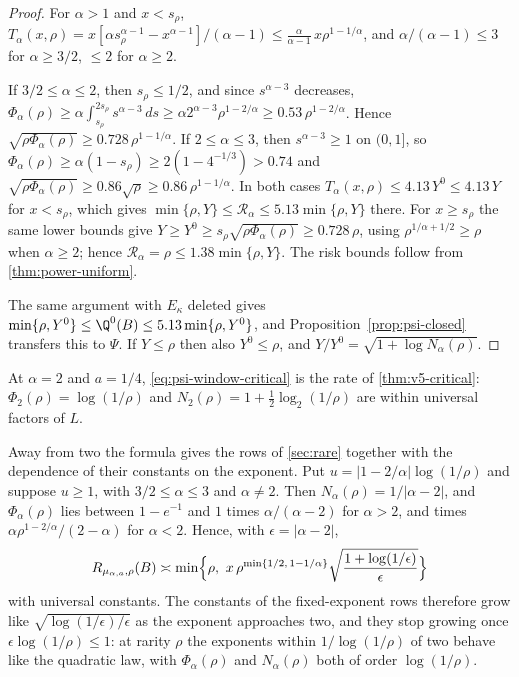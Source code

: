 \begin{proof}
For $\alpha>1$ and $x<s_\rho$,
$T_\alpha(x,\rho)=x[\alpha s_\rho^{\alpha-1}-x^{\alpha-1}]/(\alpha-1)
 \le\frac{\alpha}{\alpha-1}\,x\rho^{1-1/\alpha}$, and
$\alpha/(\alpha-1)\le3$ for $\alpha\ge3/2$, $\le2$ for $\alpha\ge2$.

If $3/2\le\alpha\le2$, then $s_\rho\le1/2$, and since $s^{\alpha-3}$
decreases,
$\Phi_\alpha(\rho)\ge\alpha\int_{s_\rho}^{2s_\rho}s^{\alpha-3}\,ds
 \ge\alpha2^{\alpha-3}\rho^{1-2/\alpha}\ge0.53\,\rho^{1-2/\alpha}$.
Hence $\sqrt{\rho\Phi_\alpha(\rho)}\ge0.728\,\rho^{1-1/\alpha}$. If
$2\le\alpha\le3$, then $s^{\alpha-3}\ge1$ on $(0,1]$, so
$\Phi_\alpha(\rho)\ge\alpha(1-s_\rho)\ge2(1-4^{-1/3})>0.74$ and
$\sqrt{\rho\Phi_\alpha(\rho)}\ge0.86\sqrt\rho\ge0.86\,\rho^{1-1/\alpha}$.
In both cases $T_\alpha(x,\rho)\le4.13\,Y^0\le4.13\,Y$ for $x<s_\rho$,
which gives $\min\{\rho,Y\}\le\mathcal R_\alpha\le5.13\min\{\rho,Y\}$ there.
For $x\ge s_\rho$ the same lower bounds give
$Y\ge Y^0\ge s_\rho\sqrt{\rho\Phi_\alpha(\rho)}\ge0.728\,\rho$, using
$\rho^{1/\alpha+1/2}\ge\rho$ when $\alpha\ge2$; hence
$\mathcal R_\alpha=\rho\le1.38\min\{\rho,Y\}$. The risk bounds follow
from \cref{thm:power-uniform}.

The same argument with $E_\kappa$ deleted gives
$\min\{\rho,Y^0\}\le\Q^0(B)\le5.13\min\{\rho,Y^0\}$, and
Proposition~\ref{prop:psi-closed} transfers this to $\Psi$. If $Y\le\rho$
then also $Y^0\le\rho$, and $Y/Y^0=\sqrt{1+\log N_\alpha(\rho)}$.
\end{proof}

\begin{remark}\label{rem:window}
At $\alpha=2$ and $a=1/4$, \eqref{eq:psi-window-critical} is the rate of
\cref{thm:v5-critical}: $\Phi_2(\rho)=\log(1/\rho)$ and
$N_2(\rho)=1+\tfrac12\log_2(1/\rho)$ are within universal factors of $L$.

Away from two the formula gives the rows of \cref{sec:rare} together
with the dependence of their constants on the exponent. Put
$u=|1-2/\alpha|\log(1/\rho)$ and suppose $u\ge1$, with
$3/2\le\alpha\le3$ and $\alpha\ne2$. Then
$N_\alpha(\rho)=1/|\alpha-2|$, and $\Phi_\alpha(\rho)$ lies between
$1-e^{-1}$ and $1$ times $\alpha/(\alpha-2)$ for $\alpha>2$, and times
$\alpha\rho^{1-2/\alpha}/(2-\alpha)$ for $\alpha<2$. Hence, with
$\epsilon=|\alpha-2|$,
\[
 R_{\mu_{\alpha,a},\rho}(B)\asymp
 \min\Bigl\{\rho,\ x\,\rho^{\min\{1/2,\,1-1/\alpha\}}
 \sqrt{\frac{1+\log(1/\epsilon)}{\epsilon}}\Bigr\}
\]
with universal constants. The constants of the fixed-exponent rows
therefore grow like $\sqrt{\log(1/\epsilon)/\epsilon}$ as the exponent
approaches two, and they stop growing once $\epsilon\log(1/\rho)\le1$:
at rarity $\rho$ the exponents within $1/\log(1/\rho)$ of two behave like
the quadratic law, with $\Phi_\alpha(\rho)$ and $N_\alpha(\rho)$ both of
order $\log(1/\rho)$.
\end{remark}

